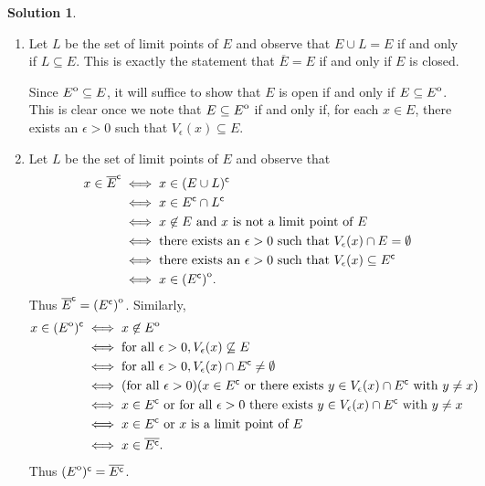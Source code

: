 \documentclass[12pt]{article}
\theoremstyle{definition}
\theoremstyle{exercise}
\theoremstyle{solution}
\newtheorem*{solution}{Solution}
\newcommand{\interior}[1]{%
  {\kern0pt#1}^{\mathrm{o}}%
}
\newcommand{\setcomp}[1]{#1^{\mathsf{c}}}
\begin{document}
\begin{solution}
    \begin{enumerate}
        \item Let \( L \) be the set of limit points of \( E \) and observe that \( E \cup L = E \) if and only if \( L \subseteq E \). This is exactly the statement that \( \overline{E} = E \) if and only if \( E \) is closed.

        Since \( \interior{E} \subseteq E \), it will suffice to show that \( E \) is open if and only if \( E \subseteq \interior{E} \). This is clear once we note that \( E \subseteq \interior{E} \) if and only if, for each \( x \in E \), there exists an \( \epsilon > 0 \) such that \( V_{\epsilon}(x) \subseteq E \).

        \item Let \( L \) be the set of limit points of \( E \) and observe that
        \begin{align*}
            x \in \setcomp{\overline{E}} &\iff x \in \setcomp{(E \cup L)} \\
            &\iff x \in \setcomp{E} \cap \setcomp{L} \\
            &\iff x \not\in E \text{ and } x \text{ is not a limit point of } E \\
            &\iff \text{there exists an } \epsilon > 0 \text{ such that } V_{\epsilon}(x) \cap E = \emptyset \\
            &\iff \text{there exists an } \epsilon > 0 \text{ such that } V_{\epsilon}(x) \subseteq \setcomp{E} \\
            &\iff x \in \interior{(\setcomp{E})}.
        \end{align*}
        Thus \( \setcomp{\overline{E}} = \interior{(\setcomp{E})} \). Similarly,
        \begin{align*}
            x \in \setcomp{(\interior{E})} &\iff x \not\in \interior{E} \\
            &\iff \text{for all } \epsilon > 0, V_{\epsilon}(x) \not\subseteq E \\
            &\iff \text{for all } \epsilon > 0, V_{\epsilon}(x) \cap \setcomp{E} \neq \emptyset \\
            &\iff (\text{for all } \epsilon > 0) (x \in \setcomp{E} \text{ or there exists } y \in V_{\epsilon}(x) \cap \setcomp{E} \text{ with } y \neq x) \\
            &\iff x \in \setcomp{E} \text{ or for all } \epsilon > 0 \text{ there exists } y \in V_{\epsilon}(x) \cap \setcomp{E} \text{ with } y \neq x \\
            &\iff x \in \setcomp{E} \text{ or } x \text{ is a limit point of } E \\
            &\iff x \in \overline{\setcomp{E}}.
        \end{align*}
        Thus \( \setcomp{(\interior{E})} = \overline{\setcomp{E}} \).
    \end{enumerate}
\end{solution}
\end{document}
